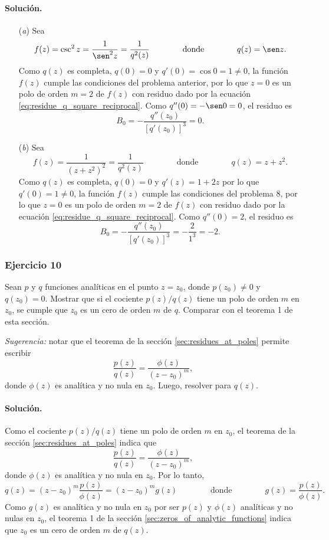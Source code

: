\documentclass[a4paper]{report}
\begin{document}
\paragraph{Solución.} 
\begin{enumerate}
 \item[(\textit{a})] Sea 
 \[
  f(z)=\csc^2z=\frac{1}{\sen^2z}=\frac{1}{q^2(z)}
  \qquad\qquad\textrm{donde}\qquad\qquad
  q(z)=\sen z.
 \]
 Como \(q(z)\) es completa, \(q(0)=0\) y \(q'(0)=\cos0=1\neq0\), la función \(f(z)\) cumple las condiciones del problema anterior, por lo que \(z=0\) es un polo de orden \(m=2\) de \(f(z)\) con residuo dado por la ecuación \ref{eq:residue_q_square_reciprocal}. Como \(q''(0)=-\sen 0=0\), el residuo es 
 \[
  B_0=-\frac{q''(z_0)}{[q'(z_0)]^3}=0.
 \]
 \item[(\textit{b})] Sea 
 \[
  f(z)=\frac{1}{(z+z^2)^2}=\frac{1}{q^2(z)}
  \qquad\qquad\textrm{donde}\qquad\qquad
  q(z)=z+z^2.
 \]
 Como \(q(z)\) es completa, \(q(0)=0\) y \(q'(z)=1+2z\) por lo que \(q'(0)=1\neq0\), la función \(f(z)\) cumple las condiciones del problema 8, por lo que \(z=0\) es un polo de orden \(m=2\) de \(f(z)\) con residuo dado por la ecuación \ref{eq:residue_q_square_reciprocal}. Como \(q''(0)=2\), el residuo es
 \[
  B_0=-\frac{q''(z_0)}{[q'(z_0)]^3}=-\frac{2}{1^3}=-2.
 \]
\end{enumerate}

\subsubsection{Ejercicio 10} 

Sean \(p\) y \(q\) funciones analíticas en el punto \(z=z_0\), donde \(p(z_0)\neq0\) y \(q(z_0)=0\). Mostrar que si el cociente \(p(z)/q(z)\) tiene un polo de orden \(m\) en \(z_0\), se cumple que \(z_0\) es un cero de orden \(m\) de \(q\). Comparar con el teorema 1 de esta sección.

\emph{Sugerencia:} notar que el teorema de la sección \ref{sec:residues_at_poles} permite escribir 
\[
 \frac{p(z)}{q(z)}=\frac{\phi(z)}{(z-z_0)^m},
\]
donde \(\phi(z)\) es analítica y no nula en \(z_0\). Luego, resolver para \(q(z)\). 

\paragraph{Solución.} Como el cociente \(p(z)/q(z)\) tiene un polo de orden \(m\) en \(z_0\), el teorema de la sección \ref{sec:residues_at_poles} indica que  
\[
 \frac{p(z)}{q(z)}=\frac{\phi(z)}{(z-z_0)^m},
\]
donde \(\phi(z)\) es analítica y no nula en \(z_0\). Por lo tanto,
\[
 q(z)=(z-z_0)^m\frac{p(z)}{\phi(z)}=(z-z_0)^mg(z)
 \qquad\qquad\textrm{donde}\qquad\qquad
 g(z)=\frac{p(z)}{\phi(z)}.
\]
Como \(g(z)\) es analítica y no nula en \(z_0\) por ser \(p(z)\) y \(\phi(z)\) analíticas y no nulas en \(z_0\), el teorema 1 de la sección \ref{sec:zeros_of_analytic_functions} indica que \(z_0\) es un cero de orden \(m\) de \(q(z)\).
\end{document}
